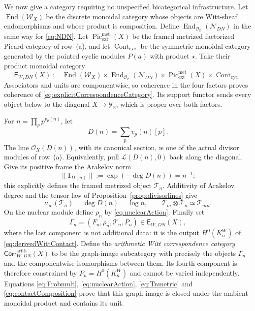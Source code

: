 \documentclass[11pt]{amsart}
\theoremstyle{definition}
\theoremstyle{remark}
\begin{document}
We now give a category requiring no unspecified bicategorical
infrastructure.  Let $\operatorname{End}(\mathcal W_X)$ be the discrete
monoidal category whose objects are Witt-sheaf endomorphisms and whose
product is composition.  Define
$\operatorname{End}_{\mathcal O_{\mathcal C}}(\mathcal N_{DN})$ in the
same way for \eqref{eq:NDN}.  Let
$\operatorname{Pic}^{\mathrm{met}}_{\mathrm{ext}}(X)$ be the framed
metrized factorized Picard category of row~(a), and let
$\operatorname{Cont}_{\mathrm{cyc}}$ be the symmetric monoidal category
generated by the pointed cyclic modules $P(a)$ with product $\star$.
Take their product monoidal category
\begin{equation}\label{eq:explicitCorrespondenceCategory}
 \mathsf E_{W,DN}(X):=
 \operatorname{End}(\mathcal W_X)\times
 \operatorname{End}_{\mathcal O_{\mathcal C}}(\mathcal N_{DN})\times
 \operatorname{Pic}^{\mathrm{met}}_{\mathrm{ext}}(X)\times
 \operatorname{Cont}_{\mathrm{cyc}}.
\end{equation}
Associators and units are componentwise, so coherence in the four factors
proves coherence of \eqref{eq:explicitCorrespondenceCategory}.
Its support functor sends every object below to the diagonal
$X\to\mathscr Y_{\mathbb S}$, which is proper over both factors.

For $n=\prod_pp^{v_p(n)}$, let
\[
 D(n)=\sum_pv_p(n)[p].
\]
The line $\mathcal O_X(D(n))$, with its canonical section, is one of the
actual divisor modules of row~(a).  Equivalently, pull
$\mathcal L(D(n),0)$ back along the diagonal.  Give its positive frame the
Arakelov norm
\[
 \|\mathbf1_{D(n)}\|:=\exp(-\deg D(n))=n^{-1};
\]
this explicitly defines the framed metrized object $\mathcal T_n$.
Additivity of Arakelov degree and the tensor law of
Proposition~\ref{prop:divisorlines} give
\begin{equation}\label{eq:Tnmetric}
 \nu_\infty(\mathcal T_n)=\deg D(n)=\log n,\qquad
 \mathcal T_m\otimes\mathcal T_n\simeq\mathcal T_{mn}.
\end{equation}
On the nuclear module define $\rho_n$ by
\eqref{eq:nuclearAction}.  Finally set
\begin{equation}\label{eq:Gamman}
 \Gamma_n=(F_n,\rho_n,\mathcal T_n,P_n)
 \in\mathsf E_{W,DN}(X),
\end{equation}
where the last component is not additional data: it is the output
$H^0(K_n^W)$ of \eqref{eq:derivedWittContact}.
Define the \emph{arithmetic Witt correspondence category}
$\mathsf{Corr}_{W,DN}^{\mathrm{arith}}(X)$ to be the graph-image
subcategory with precisely the objects $\Gamma_n$ and the componentwise
isomorphisms between them.  Its fourth component is therefore constrained
by $P_n=H^0(K_n^W)$ and cannot be varied independently.  Equations
\eqref{eq:Frobmult}, \eqref{eq:nuclearAction}, \eqref{eq:Tnmetric} and
\eqref{eq:contactComposition} prove that this graph-image is closed under
the ambient monoidal product and contains its unit.
\end{document}
